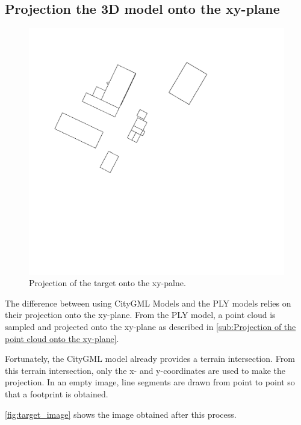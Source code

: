         \subsection{Projection the 3D model onto the xy-plane}
            \begin{figure}[H]
                \includegraphics[width=\textwidth]{images/solution_images/target_image_inverted.png}
                \caption{Projection of the target onto the xy-palne.}
                \label{fig:target_image}
            \end{figure}

            The difference between using CityGML Models and the PLY models relies on their projection onto the xy-plane.
            From the PLY model, a point cloud is sampled and projected onto the xy-plane as described in \autoref{sub:Projection of the point cloud onto the xy-plane}.

            Fortunately, the CityGML model already provides a terrain intersection.
            From this terrain intersection, only the x- and y-coordinates are used to make the projection.
            In an empty image, line segments are drawn from point to point so that a footprint is obtained.

            \autoref{fig:target_image} shows the image obtained after this process.

            
